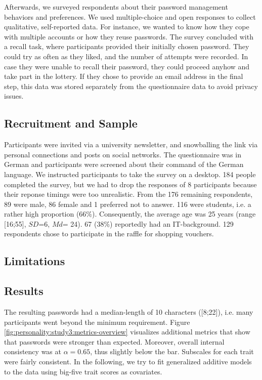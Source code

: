Afterwards, we surveyed respondents about their password management behaviors and preferences. We used multiple-choice and open responses to collect qualitative, self-reported data. For instance, we wanted to know how they cope with multiple accounts or how they reuse passwords. The survey concluded with a recall task, where participants provided their initially chosen password. They could try as often as they liked, and the number of attempts were recorded. In case they were unable to recall their password, they could proceed anyhow and take part in the lottery. If they chose to provide an email address in the final step, this data was stored separately from the questionnaire data to avoid privacy issues. 

\subsection{Recruitment and Sample}
Participants were invited via a university newsletter, and snowballing the link via personal connections and posts on social networks. The questionnaire was in German and participants were screened about their command of the German language. We instructed participants to take the survey on a desktop. 
184 people completed the survey, but we had to drop the responses of 8 participants because their reponse timings were too unrealistic. From the 176 remaining respondents, 89 were male, 86 female and 1 preferred not to answer. 116 were students, i.e. a rather high proportion (66\%). Consequently, the average age was 25 years (range [16;55], $SD$=6, $Md$= 24). 67 (38\%) reportedly had an IT-background. 129 respondents chose to participate in the raffle for shopping vouchers. 

\subsection{Limitations}

\subsection{Results}
The resulting passwords had a median-length of 10 characters ([8;22]), i.e. many participants went beyond the minimum requirement. Figure \ref{fig:personality:study3:metrics-overview} visualizes additional metrics that show that passwords were stronger than expected. Moreover, overall internal consistency was at $\alpha=0.65$, thus slightly below the bar. Subscales for each trait were fairly consistent. In the following, we try to fit generalized additive models to the data using big-five trait scores as covariates. 

